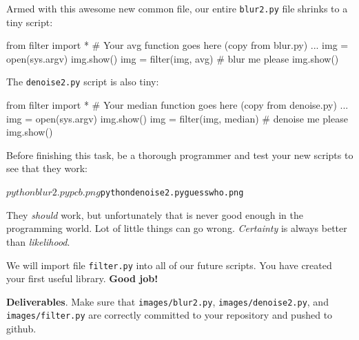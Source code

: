 Armed with this awesome new common file, our entire {\tt blur2.py} file shrinks to a tiny script:

\begin{pyverbatim}
from filter import *
# Your avg function goes here (copy from blur.py)
...
img = open(sys.argv)
img.show()
img = filter(img, avg)		# blur me please
img.show()
\end{pyverbatim}

\noindent The {\tt denoise2.py} script is also tiny:

\begin{pyverbatim}
from filter import *
# Your median function goes here (copy from denoise.py)
...
img = open(sys.argv)
img.show()
img = filter(img, median)	# denoise me please
img.show()
\end{pyverbatim}

\begin{callout}{\bctakecare}
Before finishing this task, be a thorough programmer and test your new scripts to see that they work:
\begin{alltt}
$ python blur2.py pcb.png
$ python denoise2.py guesswho.png
\end{alltt}
They {\em should} work, but unfortunately that is never good enough in the programming world.  Lot of little things can go wrong. {\em Certainty} is always better than {\em likelihood}.
\end{callout}

We will import file {\tt filter.py} into all of our future scripts. You have created your first useful library. {\bf Good job!} \scalebox{.55}{\bcsmbh}

\begin{callout}{\bcplume}
{\bf Deliverables}. Make sure that {\tt images/blur2.py}, {\tt images/denoise2.py}, and {\tt images/filter.py} are correctly committed to your repository and pushed to github. 
\end{callout}

